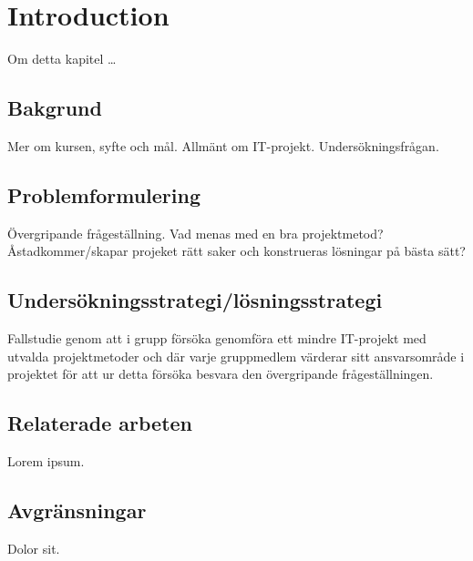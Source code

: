 \section{Introduction}
Om detta kapitel \dots

\subsection{Bakgrund}
Mer om kursen, syfte och mål. Allmänt om IT-projekt. Undersökningsfrågan.

\subsection{Problemformulering}
Övergripande frågeställning.
Vad menas med en bra projektmetod? Åstadkommer/skapar projeket rätt saker och konstrueras
lösningar på bästa sätt?

\subsection{Undersökningsstrategi/lösningsstrategi}
Fallstudie genom att i grupp försöka genomföra ett mindre IT-projekt med utvalda projektmetoder
och där varje gruppmedlem värderar sitt ansvarsområde i projektet för att ur detta försöka
besvara den övergripande frågeställningen.

\subsection{Relaterade arbeten}
Lorem ipsum.

\subsection{Avgränsningar}
Dolor sit.
